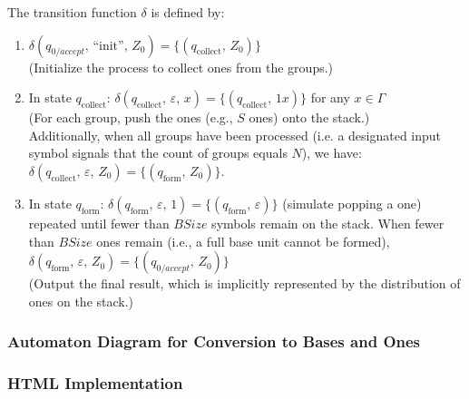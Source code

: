 \documentclass[11pt]{article}
\begin{document}
The transition function \(\delta\) is defined by:
\begin{enumerate}
    \item \(\delta(q_{0/accept},\, \text{``init''},\, Z_0) = \{(q_{\text{collect}},\, Z_0)\}\) \\
          (Initialize the process to collect ones from the groups.)
    \item In state \(q_{\text{collect}}\):  
          \(\delta(q_{\text{collect}},\, \varepsilon,\, x) = \{(q_{\text{collect}},\, 1x)\}\) for any \(x \in \Gamma\) \\
          (For each group, push the ones (e.g., \(S\) ones) onto the stack.)  
          \\
          Additionally, when all groups have been processed (i.e. a designated input symbol signals that the count of groups equals \(N\)), we have:  
          \(\delta(q_{\text{collect}},\, \varepsilon,\, Z_0) = \{(q_{\text{form}},\, Z_0)\}\).
    \item In state \(q_{\text{form}}\):  
          \(\delta(q_{\text{form}},\, \varepsilon,\, 1) = \{(q_{\text{form}},\, \varepsilon)\}\) (simulate popping a one) repeated until fewer than \(BSize\) symbols remain on the stack.  
          When fewer than \(BSize\) ones remain (i.e., a full base unit cannot be formed),  
          \(\delta(q_{\text{form}},\, \varepsilon,\, Z_0) = \{(q_{0/accept},\, Z_0)\}\) \\
          (Output the final result, which is implicitly represented by the distribution of ones on the stack.)
\end{enumerate}

\subsubsection*{Automaton Diagram for Conversion to Bases and Ones}



\clearpage

\subsubsection*{HTML Implementation}


\printbibliography
\end{document}
